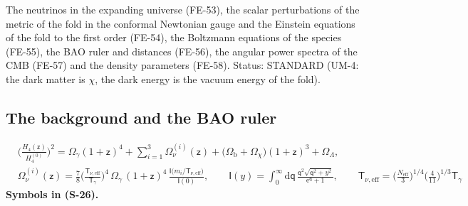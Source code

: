 \documentclass[
  10pt,
]{article}
\begin{document}
The neutrinos in the expanding universe (FE-53), the scalar
perturbations of the metric of the fold in the conformal Newtonian gauge
and the Einstein equations of the fold to the first order (FE-54), the
Boltzmann equations of the species (FE-55), the BAO ruler and distances
(FE-56), the angular power spectra of the CMB (FE-57) and the density
parameters (FE-58). Status: STANDARD (UM-4: the dark matter is \(\chi\),
the dark energy is the vacuum energy of the fold).

\hypertarget{the-background-and-the-bao-ruler}{%
\subsection{The background and the BAO
ruler}\label{the-background-and-the-bao-ruler}}

\[
\begin{aligned}
&\Big(\frac{H_4(\mathsf{z})}{H_4^{(0)}}\Big)^2 = \Omega_{\gamma}(1 + \mathsf{z})^4 + \sum_{i=1}^{3}\Omega_{\nu}^{(i)}(\mathsf{z}) + \big(\Omega_{\mathrm{b}} + \Omega_\chi\big)(1 + \mathsf{z})^3 + \Omega_\Lambda,\\
&\Omega_{\nu}^{(i)}(\mathsf{z}) = \frac78\Big(\frac{\mathsf{T}_{\nu,\mathrm{eff}}}{\mathsf{T}_\gamma}\Big)^4\,\Omega_{\gamma}\,(1 + \mathsf{z})^4\,
 \frac{\mathsf{I}\big(m_i/\mathsf{T}_{\nu,\mathrm{eff}}\big)}{\mathsf{I}(0)},\qquad
 \mathsf{I}(y) = \int_0^\infty\mathrm{d}\mathsf{q}\,\frac{\mathsf{q}^2\sqrt{\mathsf{q}^2 + y^2}}{\mathrm{e}^{\mathsf{q}} + 1},\qquad
 \mathsf{T}_{\nu,\mathrm{eff}} = \Big(\frac{N_{\mathrm{eff}}}{3}\Big)^{1/4}\Big(\frac{4}{11}\Big)^{1/3}\mathsf{T}_\gamma
\end{aligned} \tag{S-26}
\] \textbf{Symbols in (S-26).}
\end{document}

